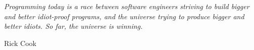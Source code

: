 
\section*{}

\vspace{7cm}
\begin{center}
 \emph{Programming today is a race between software engineers striving to build bigger and better idiot-proof programs, and the universe trying to produce bigger and better idiots. So far, the universe is winning.}
\end{center}
\begin{flushright}
 Rick Cook
\end{flushright}


\newpage